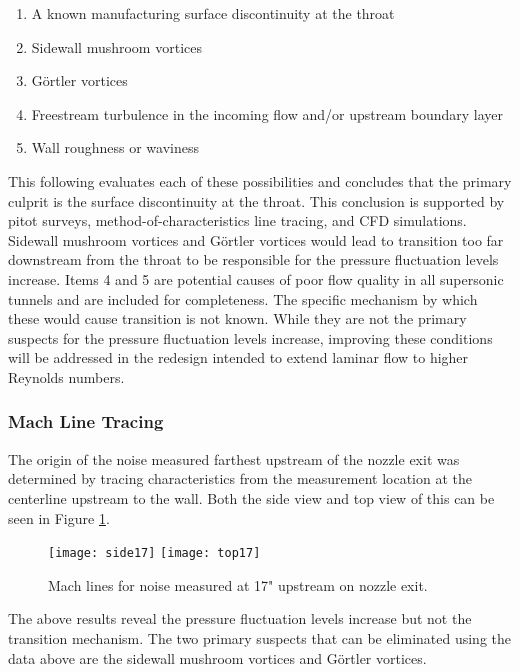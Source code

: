 \begin{enumerate}
    \item A known manufacturing surface discontinuity at the throat
    \item Sidewall mushroom vortices
    \item Görtler vortices
    \item Freestream turbulence in the incoming flow and/or upstream boundary layer
    \item Wall roughness or waviness
\end{enumerate}

This following evaluates each of these possibilities and concludes that the primary culprit is the surface discontinuity at the throat. This conclusion is supported by pitot surveys, method-of-characteristics line tracing, and CFD simulations. Sidewall mushroom vortices and Görtler vortices would lead to transition too far downstream from the throat to be responsible for the pressure fluctuation levels increase. Items 4 and 5 are potential causes of poor flow quality in all supersonic tunnels and are included for completeness. The specific mechanism by which these would cause transition is not known. While they are not the primary suspects for the pressure fluctuation levels increase, improving these conditions will be addressed in the redesign intended to extend laminar flow to higher Reynolds numbers.

\subsubsection*{Mach Line Tracing}

The origin of the noise measured farthest upstream of the nozzle exit was determined by tracing characteristics from the measurement location at the centerline upstream to the wall. Both the side view and top view of this can be seen in Figure \ref{fig:machlines}.

\begin{figure}[ht]
    \centering
    \texttt{[image: side17]}
    \texttt{[image: top17]}
    \caption{Mach lines for noise measured at 17" upstream on nozzle exit.}
    \label{fig:machlines}
\end{figure}

The above results reveal the pressure fluctuation levels increase but not the transition mechanism. The two primary suspects that can be eliminated using the data above are the sidewall mushroom vortices and Görtler vortices.

